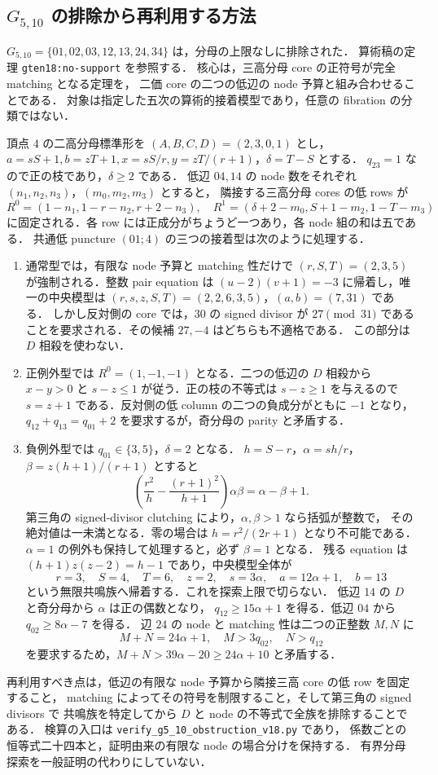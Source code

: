 \subsection{\texorpdfstring{$G_{5,10}$}{G5,10} の排除から再利用する方法}
\label{ngten18:reusable}

$G_{5,10}=\{01,02,03,12,13,24,34\}$ は，分母の上限なしに排除された．
算術稿の定理 \texttt{gten18:no-support} を参照する．
核心は，三高分母 core の正符号が完全 matching となる定理を，
二価 core の二つの低辺の node 予算と組み合わせることである．
対象は指定した五次の算術的接着模型であり，任意の fibration の分類ではない．

頂点 $4$ の二高分母標準形を $(A,B,C,D)=(2,3,0,1)$ とし，
$a=sS+1,b=zT+1,x=sS/r,y=zT/(r+1)$，$\delta=T-S$ とする．
$q_{23}=1$ なので正の枝であり，$\delta\ge2$ である．
低辺 $04,14$ の node 数をそれぞれ $(n_1,n_2,n_3)$，$(m_0,m_2,m_3)$ とすると，
隣接する三高分母 cores の低 rows が
\[
 R^0=(1-n_1,1-r-n_2,r+2-n_3),\quad
 R^1=(\delta+2-m_0,S+1-m_2,1-T-m_3)
\]
に固定される．各 row には正成分がちょうど一つあり，各 node 組の和は五である．
共通低 puncture $(01;4)$ の三つの接着型は次のように処理する．

\begin{enumerate}
\item 通常型では，有限な node 予算と matching 性だけで
$(r,S,T)=(2,3,5)$ が強制される．整数 pair equation は
$(u-2)(v+1)=-3$ に帰着し，唯一の中央模型は
$(r,s,z,S,T)=(2,2,6,3,5)$，$(a,b)=(7,31)$ である．
しかし反対側の core では，$30$ の signed divisor が
$27\pmod{31}$ であることを要求される．その候補 $27,-4$ はどちらも不適格である．
この部分は $D$ 相殺を使わない．

\item 正例外型では $R^0=(1,-1,-1)$ となる．二つの低辺の $D$ 相殺から
$x-y>0$ と $s-z\le1$ が従う．正の枝の不等式は $s-z\ge1$ を与えるので
$s=z+1$ である．反対側の低 column の二つの負成分がともに $-1$ となり，
$q_{12}+q_{13}=q_{01}+2$ を要求するが，奇分母の parity と矛盾する．

\item 負例外型では $q_{01}\in\{3,5\}$，$\delta=2$ となる．
$h=S-r$，$\alpha=sh/r$，$\beta=z(h+1)/(r+1)$ とすると
\[
 \left(\frac{r^2}{h}-\frac{(r+1)^2}{h+1}\right)\alpha\beta
   =\alpha-\beta+1.
\]
第三角の signed-divisor clutching により，$\alpha,\beta>1$ なら括弧が整数で，
その絶対値は一未満となる．零の場合は $h=r^2/(2r+1)$ となり不可能である．
$\alpha=1$ の例外も保持して処理すると，必ず $\beta=1$ となる．
残る equation は $(h+1)z(z-2)=h-1$ であり，中央模型全体が
\[
 r=3,\quad S=4,\quad T=6,\quad z=2,\quad s=3\alpha,\quad
 a=12\alpha+1,\quad b=13
\]
という無限共鳴族へ帰着する．これを探索上限で切らない．
低辺 $14$ の $D$ と奇分母から $\alpha$ は正の偶数となり，
$q_{12}\ge15\alpha+1$ を得る．低辺 $04$ から $q_{02}\ge8\alpha-7$ を得る．
辺 $24$ の node と matching 性は二つの正整数 $M,N$ に
\[
 M+N=24\alpha+1,\quad M>3q_{02},\quad N>q_{12}
\]
を要求するため，$M+N>39\alpha-20\ge24\alpha+10$ と矛盾する．
\end{enumerate}

再利用すべき点は，低辺の有限な node 予算から隣接三高 core の低 row を固定すること，
matching によってその符号を制限すること，そして第三角の signed divisors で
共鳴族を特定してから $D$ と node の不等式で全族を排除することである．
検算の入口は \nolinkurl{verify_g5_10_obstruction_v18.py} であり，
係数ごとの恒等式二十四本と，証明由来の有限な node の場合分けを保持する．
有界分母探索を一般証明の代わりにしていない．
